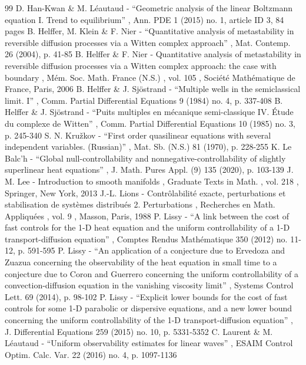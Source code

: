 \begin{thebibliography}{99}
 D. Han-Kwan \& M. Léautaud - “Geometric analysis of the linear Boltzmann equation I. Trend to equilibrium” , Ann. PDE 1 (2015) no. 1, article ID 3, 84 pages
 B. Helffer, M. Klein \& F. Nier - “Quantitative analysis of metastability in reversible diffusion processes via a Witten complex approach” , Mat. Contemp. 26 (2004), p. 41-85
 B. Helffer \& F. Nier - Quantitative analysis of metastability in reversible diffusion processes via a Witten complex approach: the case with boundary , Mém. Soc. Math. France (N.S.) , vol. 105 , Société Mathématique de France, Paris, 2006
 B. Helffer \& J. Sjöstrand - “Multiple wells in the semiclassical limit. I” , Comm. Partial Differential Equations 9 (1984) no. 4, p. 337-408
 B. Helffer \& J. Sjöstrand - “Puits multiples en mécanique semi-classique IV. Étude du complexe de Witten” , Comm. Partial Differential Equations 10 (1985) no. 3, p. 245-340
 S. N. Kružkov - “First order quasilinear equations with several independent variables. (Russian)” , Mat. Sb. (N.S.) 81 (1970), p. 228-255
 K. Le Balc’h - “Global null-controllability and nonnegative-controllability of slightly superlinear heat equations” , J. Math. Pures Appl. (9) 135 (2020), p. 103-139
 J. M. Lee - Introduction to smooth manifolds , Graduate Texts in Math. , vol. 218 , Springer, New York, 2013
 J.-L. Lions - Contrôlabilité exacte, perturbations et stabilisation de systèmes distribués 2. Perturbations , Recherches en Math. Appliquées , vol. 9 , Masson, Paris, 1988
 P. Lissy - “A link between the cost of fast controls for the 1-D heat equation and the uniform controllability of a 1-D transport-diffusion equation” , Comptes Rendus Mathématique 350 (2012) no. 11-12, p. 591-595
 P. Lissy - “An application of a conjecture due to Ervedoza and Zuazua concerning the observability of the heat equation in small time to a conjecture due to Coron and Guerrero concerning the uniform controllability of a convection-diffusion equation in the vanishing viscosity limit” , Systems Control Lett. 69 (2014), p. 98-102
 P. Lissy - “Explicit lower bounds for the cost of fast controls for some 1-D parabolic or dispersive equations, and a new lower bound concerning the uniform controllability of the 1-D transport-diffusion equation” , J. Differential Equations 259 (2015) no. 10, p. 5331-5352
 C. Laurent \& M. Léautaud - “Uniform observability estimates for linear waves” , ESAIM Control Optim. Calc. Var. 22 (2016) no. 4, p. 1097-1136

\end{thebibliography}
